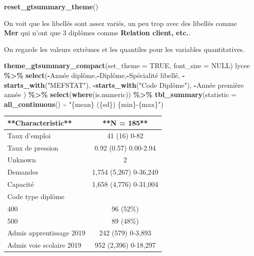 \documentclass[
]{book}
\newenvironment{Shaded}{\begin{snugshade}}{\end{snugshade}}
\newcommand{\AttributeTok}[1]{\textcolor[rgb]{0.13,0.29,0.53}{#1}}
\newcommand{\ConstantTok}[1]{\textcolor[rgb]{0.56,0.35,0.01}{#1}}
\newcommand{\FunctionTok}[1]{\textcolor[rgb]{0.13,0.29,0.53}{\textbf{#1}}}
\newcommand{\NormalTok}[1]{#1}
\newcommand{\SpecialCharTok}[1]{\textcolor[rgb]{0.81,0.36,0.00}{\textbf{#1}}}
\newcommand{\StringTok}[1]{\textcolor[rgb]{0.31,0.60,0.02}{#1}}
\begin{document}
\begin{Shaded}
\begin{Highlighting}[]
\FunctionTok{reset\_gtsummary\_theme}\NormalTok{()}
\end{Highlighting}
\end{Shaded}

On voit que les libellés sont assez variés, un peu trop avec des libellés comme
\textbf{Mer} qui n'ont que 3 diplômes comme \textbf{Relation client, etc.}.

On regarde les valeurs extrèmes et les quantiles pour les variables quantitatives.

\begin{Shaded}
\begin{Highlighting}[]
\FunctionTok{theme\_gtsummary\_compact}\NormalTok{(}\AttributeTok{set\_theme =} \ConstantTok{TRUE}\NormalTok{, }\AttributeTok{font\_size =} \ConstantTok{NULL}\NormalTok{)}
\NormalTok{lycee }\SpecialCharTok{\%\textgreater{}\%} \FunctionTok{select}\NormalTok{(}\SpecialCharTok{{-}}\StringTok{\textasciigrave{}}\AttributeTok{Année diplôme}\StringTok{\textasciigrave{}}\NormalTok{,}\SpecialCharTok{{-}}\NormalTok{Diplôme,}\SpecialCharTok{{-}}\StringTok{\textasciigrave{}}\AttributeTok{Spécialité libellé}\StringTok{\textasciigrave{}}\NormalTok{,}
                 \SpecialCharTok{{-}}\FunctionTok{starts\_with}\NormalTok{(}\StringTok{"MEFSTAT"}\NormalTok{),}
                 \SpecialCharTok{{-}}\FunctionTok{starts\_with}\NormalTok{(}\StringTok{"Code Diplôme"}\NormalTok{),}
                 \SpecialCharTok{{-}}\StringTok{\textasciigrave{}}\AttributeTok{Année première année}\StringTok{\textasciigrave{}}
\NormalTok{                 ) }\SpecialCharTok{\%\textgreater{}\%} \FunctionTok{select}\NormalTok{(}\FunctionTok{where}\NormalTok{(is.numeric)) }\SpecialCharTok{\%\textgreater{}\%}
  \FunctionTok{tbl\_summary}\NormalTok{(}\AttributeTok{statistic =} \FunctionTok{all\_continuous}\NormalTok{() }\SpecialCharTok{\textasciitilde{}} \StringTok{"\{mean\} (\{sd\}) \{min\}{-}\{max\}"}\NormalTok{)}
\end{Highlighting}
\end{Shaded}

\begin{tabular}{l|c}
\hline
**Characteristic** & **N = 185**\\
\hline
Taux d'emploi & 41 (16) 0-82\\
\hline
Taux de pression & 0.92 (0.57) 0.00-2.94\\
\hline
Unknown & 2\\
\hline
Demandes & 1,754 (5,267) 0-36,249\\
\hline
Capacité & 1,658 (4,776) 0-31,004\\
\hline
Code type diplôme & \\
\hline
400 & 96 (52\%)\\
\hline
500 & 89 (48\%)\\
\hline
Admis apprentissage 2019 & 242 (579) 0-3,893\\
\hline
Admis voie scolaire 2019 & 952 (2,396) 0-18,297\\
\hline
\end{tabular}
\end{document}
